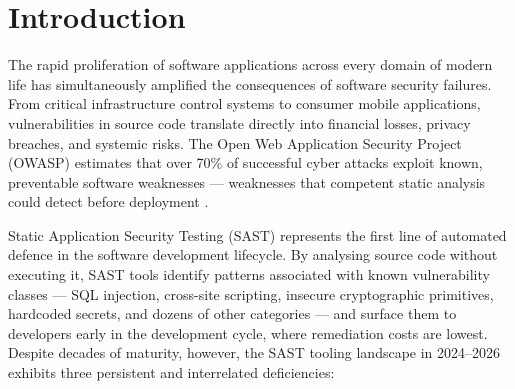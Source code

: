 \chapter{Introduction}
\label{ch:intro}

The rapid proliferation of software applications across every domain of modern life has simultaneously amplified the consequences of software security failures. From critical infrastructure control systems to consumer mobile applications, vulnerabilities in source code translate directly into financial losses, privacy breaches, and systemic risks. The Open Web Application Security Project (OWASP) estimates that over 70\% of successful cyber attacks exploit known, preventable software weaknesses --- weaknesses that competent static analysis could detect before deployment \cite{owasp_top10_2021}.

Static Application Security Testing (SAST) represents the first line of automated defence in the software development lifecycle. By analysing source code without executing it, SAST tools identify patterns associated with known vulnerability classes --- SQL injection, cross-site scripting, insecure cryptographic primitives, hardcoded secrets, and dozens of other categories --- and surface them to developers early in the development cycle, where remediation costs are lowest. Despite decades of maturity, however, the SAST tooling landscape in 2024--2026 exhibits three persistent and interrelated deficiencies:

